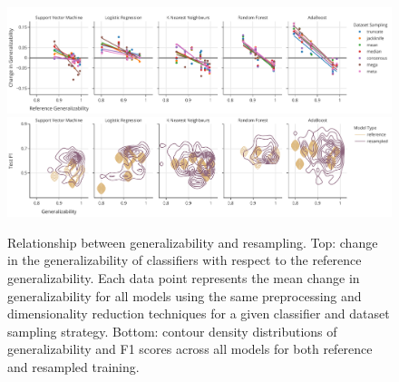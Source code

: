 \documentclass[num-refs]{nbdt-article}
\begin{document}
\begin{figure}[hbtp]\centering
\includegraphics[width=0.8\linewidth]{figures/2a_app.pdf}
\includegraphics[width=0.8\linewidth]{figures/2b_app.pdf}
\caption{Relationship between generalizability and resampling. Top: change in the generalizability of classifiers with respect to the reference generalizability. Each data point represents the mean change in generalizability for all models using the same preprocessing and dimensionality reduction techniques for a given classifier and dataset sampling strategy. Bottom: contour density distributions of generalizability and F1 scores across all models for both reference and resampled training.
}
\label{fig:change_in_gen_app}
\end{figure}


\end{document}
